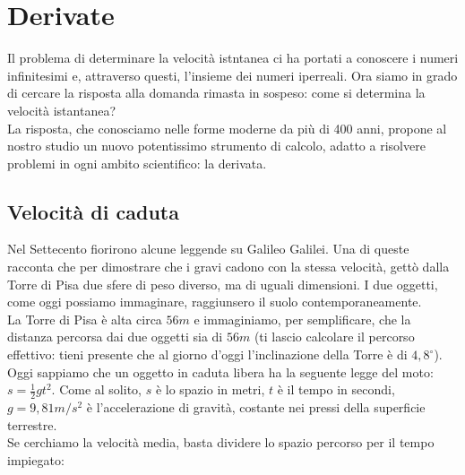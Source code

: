 
\chapter{Derivate}
% 

Il problema di determinare la velocità istntanea ci ha portati a conoscere 
i numeri infinitesimi e, attraverso questi, l'insieme dei numeri iperreali.
Ora siamo in grado di cercare la risposta alla domanda rimasta in sospeso: 
come si determina la velocità istantanea?\\
La risposta, che conosciamo nelle forme moderne da più di 400 anni,
propone al nostro studio un nuovo potentissimo strumento di calcolo, adatto a 
risolvere problemi in ogni ambito scientifico: la derivata.

\section{Velocità di caduta}
\label{04_diffvelcaduta}
Nel Settecento fiorirono alcune leggende su Galileo Galilei. Una di queste racconta 
che per dimostrare che i gravi cadono con la stessa velocità, gettò dalla Torre
di Pisa due sfere di peso diverso, ma di uguali dimensioni. I due oggetti, come
oggi possiamo immaginare, raggiunsero il suolo contemporaneamente.\\
La Torre di Pisa è alta circa $56m$ e immaginiamo, per semplificare, che la 
distanza percorsa dai due oggetti sia di $56m$ (ti lascio calcolare il 
percorso effettivo: tieni presente che al giorno d'oggi l'inclinazione della 
Torre è di $4,8^\circ$).\\
Oggi sappiamo che un oggetto in caduta libera ha la seguente legge del moto:
\(s=\frac{1}{2}gt^2\). Come al solito, $s$ è lo spazio in metri, $t$ è il 
tempo in secondi, $g=9,81 m/s^2$ è l'accelerazione di gravità, costante nei
pressi della superficie terrestre.\\
Se cerchiamo la velocità media, basta dividere lo spazio percorso per il tempo
impiegato:

